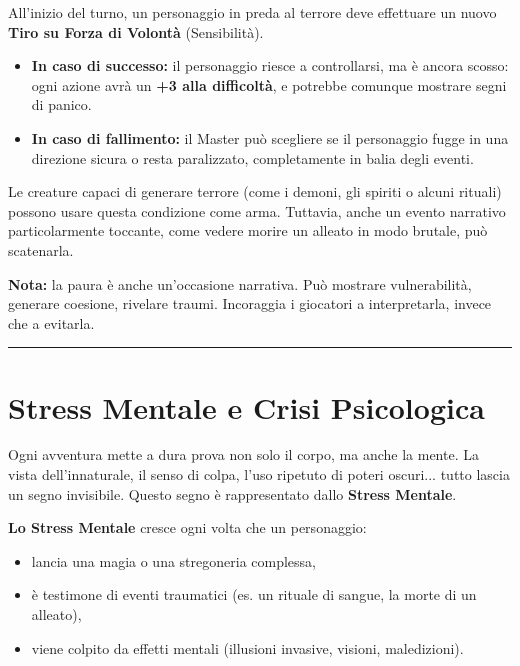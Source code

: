 \documentclass[../manuale_main.tex]{subfiles}
\begin{document}
All’inizio del turno, un personaggio in preda al terrore deve effettuare un nuovo \textbf{Tiro su Forza di Volontà} (Sensibilità).

\begin{itemize}
\item \textbf{In caso di successo:} il personaggio riesce a controllarsi, ma è ancora scosso: ogni azione avrà un \textbf{+3 alla difficoltà}, e potrebbe comunque mostrare segni di panico.
\item \textbf{In caso di fallimento:} il Master può scegliere se il personaggio fugge in una direzione sicura o resta paralizzato, completamente in balia degli eventi.
\end{itemize}

Le creature capaci di generare terrore (come i demoni, gli spiriti o alcuni rituali) possono usare questa condizione come arma. Tuttavia, anche un evento narrativo particolarmente toccante, come vedere morire un alleato in modo brutale, può scatenarla.

\textbf{Nota:} la paura è anche un’occasione narrativa. Può mostrare vulnerabilità, generare coesione, rivelare traumi. Incoraggia i giocatori a interpretarla, invece che a evitarla.

\vspace{0.5cm}
\noindent
\begin{center}
\rule{\textwidth}{0.4pt} 
\end{center}
\vspace{0.5cm}

\section{Stress Mentale e Crisi Psicologica}

Ogni avventura mette a dura prova non solo il corpo, ma anche la mente. La vista dell’innaturale, il senso di colpa, l’uso ripetuto di poteri oscuri... tutto lascia un segno invisibile. Questo segno è rappresentato dallo \textbf{Stress Mentale}.

\textbf{Lo Stress Mentale} cresce ogni volta che un personaggio:
\begin{itemize}
\item lancia una magia o una stregoneria complessa,
\item è testimone di eventi traumatici (es. un rituale di sangue, la morte di un alleato),
\item viene colpito da effetti mentali (illusioni invasive, visioni, maledizioni).
\end{itemize}
\end{document}
